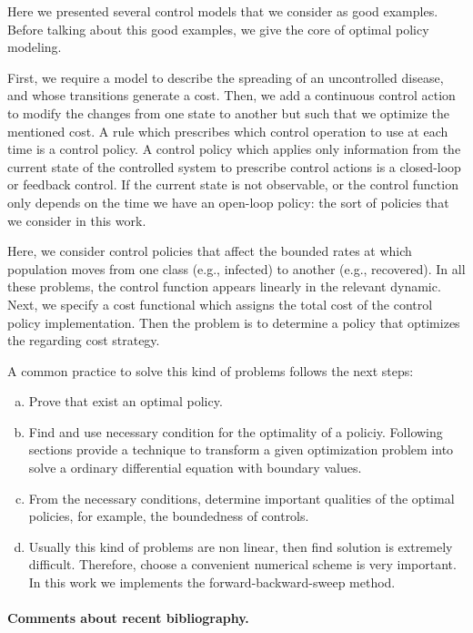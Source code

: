 Here we presented several control models that we consider as good 
examples. Before talking about this good examples, we give the core of optimal 
policy modeling.

First, we require a model to describe the spreading of an uncontrolled disease,
and whose transitions generate a cost. Then, we add a continuous control action
to modify the changes from one state to another but such that we optimize the
mentioned cost. A rule which prescribes which control operation to use at each
time is a control policy. A control policy which applies only information from
the current state of the controlled system to prescribe control actions is a
closed-loop or feedback control. If the current state is not observable, or the
control function only depends on the time we have an open-loop policy: the sort
of policies that we consider in this work.

  Here, we consider control policies that affect the bounded rates at which
population moves from one class (e.g., infected) to another (e.g., recovered).
In all these problems, the control function appears linearly in the relevant
dynamic. Next, we specify a cost functional which assigns the total cost of the
control policy implementation. Then the problem is to determine a policy that
optimizes the regarding cost strategy.

  A common practice to solve this kind of problems follows the next steps:
  \begin{enumerate}[(a)]
    \item
      Prove that exist an optimal policy.
    \item 
      Find and use necessary condition for the optimality of a policiy.
      Following sections provide a technique to transform a given optimization
      problem into solve a ordinary differential equation with boundary values.
    \item 
      From the necessary conditions, determine important qualities of the 
      optimal policies, for example, the boundedness of controls.
    \item 
      Usually this kind of problems are non linear, then find solution is 
      extremely difficult. Therefore, choose a convenient numerical scheme is
      very important. In this work we implements the forward-backward-sweep 
      method.
  \end{enumerate}
\paragraph{Comments about recent bibliography.}

